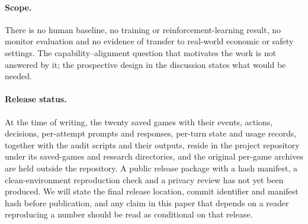 \paragraph{Scope.} There is no human baseline, no training or reinforcement-learning result, no monitor evaluation and no evidence of transfer to real-world economic or safety settings. The capability--alignment question that motivates the work is not answered by it; the prospective design in the discussion states what would be needed.

\paragraph{Release status.} At the time of writing, the twenty saved games with their events, actions, decisions, per-attempt prompts and responses, per-turn state and usage records, together with the audit scripts and their outputs, reside in the project repository under its saved-games and research directories, and the original per-game archives are held outside the repository. A public release package with a hash manifest, a clean-environment reproduction check and a privacy review has not yet been produced. We will state the final release location, commit identifier and manifest hash before publication, and any claim in this paper that depends on a reader reproducing a number should be read as conditional on that release.
